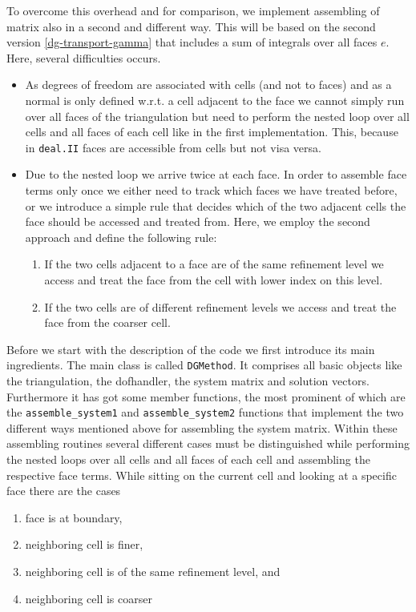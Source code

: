 \documentclass[11pt]{article}
\begin{document}
To overcome this overhead and for comparison, we implement
assembling of matrix also in a second and different way. This will
be based on the second version \eqref{dg-transport-gamma} that
includes a sum of integrals over all faces $e$. Here, several
difficulties occurs.
\begin{itemize}
\item As degrees of freedom are associated with cells (and not to faces)
  and as a normal is only defined w.r.t. a cell adjacent to the face we
  cannot simply run over all faces of the triangulation but need to
  perform the nested loop over all cells and all faces of each cell
  like in the first implementation.  This, because in {\tt deal.II}
  faces are accessible from cells but not visa versa.
\item Due to the nested loop we arrive twice at each face. In order to
  assemble face terms only once we either need to track which
  faces we have treated before, or we introduce a simple rule that decides
  which of the two adjacent cells the face should be accessed and
  treated from.  Here, we employ the second approach and define the
  following rule:
  \begin{enumerate}
  \renewcommand{\labelenumi}{\alph{enumi})}
  \item If the two cells adjacent to a face are of the same refinement level we access and treat the face from the cell with lower index on this level.
  \item If the two cells are of different refinement levels we access
    and treat the face from the coarser cell.
  \end{enumerate}
\end{itemize}
Before we start with the description of the code we first introduce
its main ingredients. The main class is called
{\tt DGMethod}. It comprises all basic objects like the
triangulation, the dofhandler, the system matrix and solution vectors.
Furthermore it has got some member functions, the most prominent of
which are the {\tt assemble\_system1} and {\tt assemble\_system2}
functions that implement the two different ways mentioned above for
assembling the system matrix. Within these assembling routines several
different cases must be distinguished while performing the nested
loops over all cells and all faces of each cell and assembling the
respective face terms. While sitting on the current cell and looking
at a specific face there are the cases
\begin{enumerate}
\item face is at boundary,
\item neighboring cell is finer,
\item neighboring cell is of the same refinement level, and
\item neighboring cell is coarser
\end{enumerate}
\end{document}
